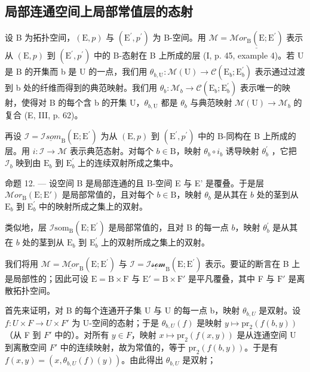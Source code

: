 \subsection{局部连通空间上局部常值层的态射}

设 B 为拓扑空间，\((\mathrm{E},p)\) 与 \((\mathrm{E}^{\prime},p^{\prime})\) 为 B-空间。用 \(\mathcal{M} = \underline{\mathcal{M}or_{\mathrm{B}}(\mathrm{E};\mathrm{E}^{\prime})}\) 表示从 \((\mathrm{E},p)\) 到 \((\mathrm{E}^{\prime},p^{\prime})\) 中的 B-态射在 B 上所成的层 (I, p. 45, example 4)。若 U 是 B 的开集而 b 是 U 的一点，我们用 \(\theta_{b,\mathrm{U}}\colon\mathcal{M}(\mathrm{U})\to\mathcal{C}(\mathrm{E}_{b};\mathrm{E}_{b}^{\prime})\) 表示通过过渡到 b 处的纤维而得到的典范映射。我们用 \(\theta_{b}\colon\mathcal{M}_{b}\to\mathcal{C}(\mathrm{E}_{b};\mathrm{E}_{b}^{\prime})\) 表示唯一的映射，使得对 B 的每个含 b 的开集 U，\(\theta_{b,\mathrm{U}}\) 都是 \(\theta_{b}\) 与典范映射 \(\mathcal{M}(\mathrm{U})\to\mathcal{M}_{b}\) 的复合 (E, III, p. 62)。

再设 \(\mathcal{I} = \underline{\mathcal{I}som}_{\mathrm{B}}(\mathrm{E};\mathrm{E}^{\prime})\) 为从 \((\mathrm{E},p)\) 到 \((\mathrm{E}^{\prime},p^{\prime})\) 中的 B-同构在 B 上所成的层。用 \(i\colon \mathcal{I}\to \mathcal{M}\) 表示典范态射。对每个 \(b\in \mathrm{B}\)，映射 \(\theta_{b}\circ i_{b}\) 诱导映射 \(\theta_b^\prime\) ，它把 \(\mathcal{I}_b\) 映到由 \(\mathrm{E}_b\) 到 \(\mathrm{E}_b^\prime\) 上的连续双射所成之集中。

命题 12. --- 设空间 B 是局部连通的且 B-空间 E 与 E' 是覆叠。于是层 \(\mathcal{M}or_{\mathrm{B}}(\mathrm{E};\mathrm{E}')\) 是局部常值的，且对每个 \(b\in\mathrm{B}\)，映射 \(\theta_{b}\) 是从其在 \(b\) 处的茎到从 \(\mathrm{E}_{b}\) 到 \(\mathrm{E}_{b}^{\prime}\) 中的映射所成之集上的双射。

类似地，层 \(\mathcal{I}\text{som}_{\mathrm{B}}(\mathrm{E};\mathrm{E}^{\prime})\) 是局部常值的，且对 B 的每一点 \(b\)，映射 \(\theta_{b}^{\prime}\) 是从其在 \(b\) 处的茎到从 \(\mathrm{E}_{b}\) 到 \(\mathrm{E}_{b}^{\prime}\) 上的双射所成之集上的双射。

我们将用 \(\mathcal{M} = \underline{\mathcal{M}or}_{\mathrm{B}}(\mathrm{E};\mathrm{E}^{\prime})\) 与 \(\mathcal{I} = \underline{\mathcal{Isom}}_{\mathrm{B}}(\mathrm{E};\mathrm{E}^{\prime})\) 表示。要证的断言在 B 上是局部性的；因此可设 \(\mathrm{E} = \mathrm{B}\times \mathrm{F}\) 与 \(\mathrm{E}' = \mathrm{B}\times \mathrm{F}'\) 是平凡覆叠，其中 F 与 \(\mathrm{F}'\) 是离散拓扑空间。

首先来证明，对 B 的每个连通开子集 U 与 U 的每一点 b，映射 \(\theta_{b,U}\) 是双射。设 \(f\colon U\times F\to U\times F'\) 为 U-空间的态射；于是 \(\theta_{b,U}(f)\) 是映射 \(y\mapsto\mathrm{pr}_{2}(f(b,y))\) （从 F 到 \(F'\) 中的）。对所有 \(y\in F\)，映射 \(x\mapsto\mathrm{pr}_{2}(f(x,y))\) 是从连通空间 U 到离散空间 \(F'\) 中的连续映射，故为常值的，等于 \(\mathrm{pr}_{2}(f(b,y))\)。于是有 \(f(x,y)=(x,\theta_{b,U}(f)(y))\)。由此得出 \(\theta_{b,U}\) 是双射；

